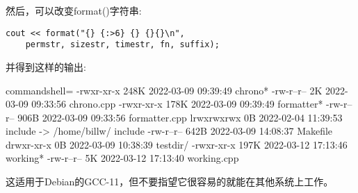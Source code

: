 然后，可以改变format()字符串:

\begin{lstlisting}[style=styleCXX]
cout << format("{} {:>6} {} {}{}\n",
	permstr, sizestr, timestr, fn, suffix);
\end{lstlisting}

并得到这样的输出:

\begin{tcblisting}{commandshell={}}
-rwxr-xr-x 248K 2022-03-09 09:39:49 chrono*
-rw-r--r--   2K 2022-03-09 09:33:56 chrono.cpp
-rwxr-xr-x 178K 2022-03-09 09:39:49 formatter*
-rw-r--r-- 906B 2022-03-09 09:33:56 formatter.cpp
lrwxrwxrwx   0B 2022-02-04 11:39:53 include -> /home/billw/
include
-rw-r--r-- 642B 2022-03-09 14:08:37 Makefile
drwxr-xr-x   0B 2022-03-09 10:38:39 testdir/
-rwxr-xr-x 197K 2022-03-12 17:13:46 working*
-rw-r--r--   5K 2022-03-12 17:13:40 working.cpp
\end{tcblisting}

这适用于Debian的GCC-11，但不要指望它很容易的就能在其他系统上工作。










